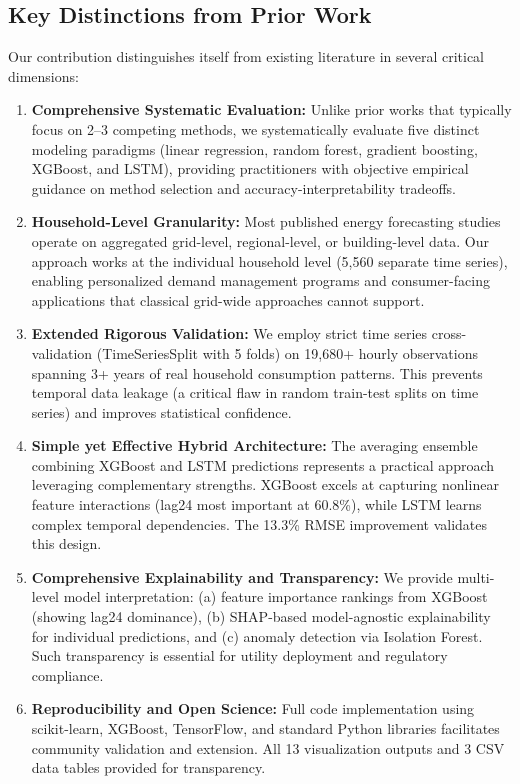 \subsection{Key Distinctions from Prior Work}

Our contribution distinguishes itself from existing literature in several critical dimensions:

\begin{enumerate}
    \item \textbf{Comprehensive Systematic Evaluation:} Unlike prior works that typically focus on 2--3 competing methods, we systematically evaluate five distinct modeling paradigms (linear regression, random forest, gradient boosting, XGBoost, and LSTM), providing practitioners with objective empirical guidance on method selection and accuracy-interpretability tradeoffs.
    
    \item \textbf{Household-Level Granularity:} Most published energy forecasting studies operate on aggregated grid-level, regional-level, or building-level data. Our approach works at the individual household level (5,560 separate time series), enabling personalized demand management programs and consumer-facing applications that classical grid-wide approaches cannot support.
    
    \item \textbf{Extended Rigorous Validation:} We employ strict time series cross-validation (TimeSeriesSplit with 5 folds) on 19,680+ hourly observations spanning 3+ years of real household consumption patterns. This prevents temporal data leakage (a critical flaw in random train-test splits on time series) and improves statistical confidence.
    
    \item \textbf{Simple yet Effective Hybrid Architecture:} The averaging ensemble combining XGBoost and LSTM predictions represents a practical approach leveraging complementary strengths. XGBoost excels at capturing nonlinear feature interactions (lag24 most important at 60.8\%), while LSTM learns complex temporal dependencies. The 13.3\% RMSE improvement validates this design.
    
    \item \textbf{Comprehensive Explainability and Transparency:} We provide multi-level model interpretation: (a) feature importance rankings from XGBoost (showing lag24 dominance), (b) SHAP-based model-agnostic explainability for individual predictions, and (c) anomaly detection via Isolation Forest. Such transparency is essential for utility deployment and regulatory compliance.
    
    \item \textbf{Reproducibility and Open Science:} Full code implementation using scikit-learn, XGBoost, TensorFlow, and standard Python libraries facilitates community validation and extension. All 13 visualization outputs and 3 CSV data tables provided for transparency.
\end{enumerate}

